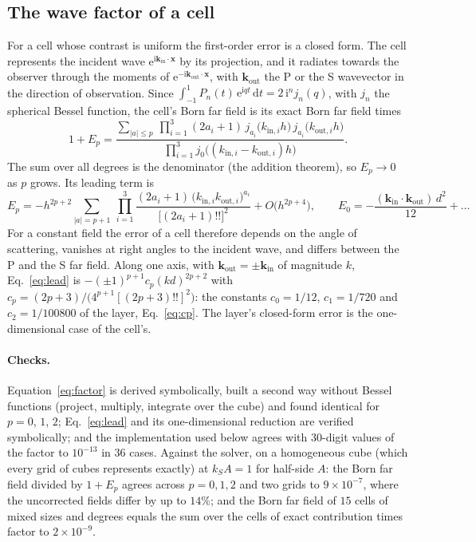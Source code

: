 \documentclass[11pt,a4paper]{article}
\newcommand{\bk}{\mathbf{k}}
\newcommand{\bx}{\mathbf{x}}
\newcommand{\dd}{\mathrm{d}}
\begin{document}
\subsection{The wave factor of a cell}\label{sec:factor}

For a cell whose contrast is uniform the first-order error is a closed form. The cell represents the
incident wave $\mathrm{e}^{\mathrm{i}\bk_{\mathrm{in}}\cdot\bx}$ by its projection, and it radiates
towards the observer through the moments of $\mathrm{e}^{-\mathrm{i}\bk_{\mathrm{out}}\cdot\bx}$, with
$\bk_{\mathrm{out}}$ the P or the S wavevector in the direction of observation. Since
$\int_{-1}^{1}P_n(t)\,\mathrm{e}^{\mathrm{i}qt}\,\dd t=2\,\mathrm{i}^n j_n(q)$, with $j_n$ the spherical
Bessel function, the cell's Born far field is its exact Born far field times
\begin{equation}\label{eq:factor}
  1+E_p=\frac{\displaystyle\sum_{|a|\le p}\ \prod_{i=1}^{3}(2a_i+1)\,
        j_{a_i}\bigl(k_{\mathrm{in},i}h\bigr)\,j_{a_i}\bigl(k_{\mathrm{out},i}h\bigr)}
       {\displaystyle\prod_{i=1}^{3}j_0\bigl((k_{\mathrm{in},i}-k_{\mathrm{out},i})h\bigr)} .
\end{equation}
The sum over all degrees is the denominator (the addition theorem), so $E_p\to0$ as $p$ grows. Its
leading term is
\begin{equation}\label{eq:lead}
  E_p=-h^{2p+2}\sum_{|a|=p+1}\ \prod_{i=1}^{3}
      \frac{(2a_i+1)\,\bigl(k_{\mathrm{in},i}k_{\mathrm{out},i}\bigr)^{a_i}}{\bigl[(2a_i+1)!!\bigr]^2}
      +O\bigl(h^{2p+4}\bigr),
  \qquad E_0=-\frac{(\bk_{\mathrm{in}}\cdot\bk_{\mathrm{out}})\,d^2}{12}+\dots
\end{equation}
For a constant field the error of a cell therefore depends on the angle of scattering, vanishes at
right angles to the incident wave, and differs between the P and the S far field. Along one axis, with
$\bk_{\mathrm{out}}=\pm\bk_{\mathrm{in}}$ of magnitude $k$, Eq.~\eqref{eq:lead} is
$-(\pm1)^{p+1}c_p(kd)^{2p+2}$ with $c_p=(2p+3)/\bigl(4^{p+1}[(2p+3)!!]^2\bigr)$: the constants
$c_0=1/12$, $c_1=1/720$ and $c_2=1/100800$ of the layer, Eq.~\eqref{eq:cp}. The layer's
closed-form error is the one-dimensional case of the cell's.

\paragraph{Checks.} Equation~\eqref{eq:factor} is derived symbolically, built a second way without
Bessel functions (project, multiply, integrate over the cube) and found identical for $p=0$, $1$, $2$;
Eq.~\eqref{eq:lead} and its one-dimensional reduction are verified symbolically; and the implementation
used below agrees with $30$-digit values of the factor to $10^{-13}$ in $36$ cases. Against the solver,
on a homogeneous cube (which every grid of cubes represents exactly) at $k_SA=1$ for half-side $A$: the
Born far field divided by $1+E_p$ agrees across $p=0,1,2$ and two grids to $9\times10^{-7}$, where the
uncorrected fields differ by up to $14\%$; and the Born far field of $15$ cells of mixed sizes and
degrees equals the sum over the cells of exact contribution times factor to $2\times10^{-9}$.
\end{document}
